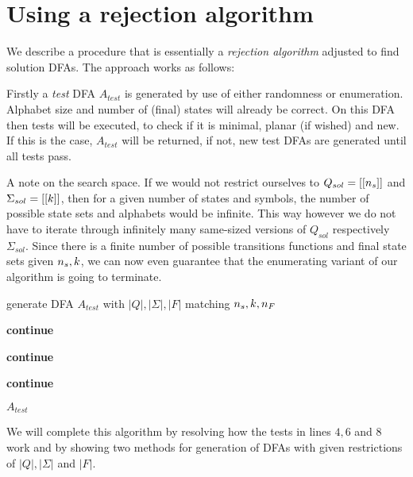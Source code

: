 \section{Using a rejection algorithm}

We describe a procedure that is essentially a \emph{rejection algorithm} adjusted to find solution DFAs. The approach works as follows:

Firstly a \emph{test} DFA $A_{test}$ is generated by use of either randomness or enumeration. Alphabet size and number of (final) states will already be correct. On this DFA then tests will be executed, to check if it is minimal, planar (if wished) and new. If this is the case, $A_{test}$ will be returned, if not, new test DFAs are generated until all tests pass.

A note on the search space. If we would not restrict ourselves to $Q_{sol} = [[{n_s}]]$ and $\Sigma_{sol} = [[k]]$, then for a given number of states and symbols, the number of possible state sets and alphabets would be infinite. This way however we do not have to iterate through infinitely many same-sized versions of $Q_{sol}$ respectively $\Sigma_{sol}$. Since there is a finite number of possible transitions functions and final state sets given ${n_s}, k$, we can now even guarantee that the enumerating variant of our algorithm is going to terminate.

\vspace{0.2cm}
\begin{algorithmic}[1]
		
			\vspace{0.2cm}
		
			\State generate DFA $A_{test}$ with $|Q|, |\Sigma|, |F|$ matching ${n_s}, k, {n_F}$
			
			\vspace{0.2cm}
			
				\State \textbf{continue}
			\EndIf
			
				\State \textbf{continue}
			\EndIf
			
				\State \textbf{continue}
			\EndIf
			
			\vspace{0.2cm}
			
			\State\Return $A_{test}$
		\EndWhile
	\EndFunction
\end{algorithmic}
\vspace{0.2cm}
We will complete this algorithm by resolving how the tests in lines $4, 6$ and $8$ work and by showing two methods for generation of DFAs with given restrictions of $|Q|, |\Sigma|$ and $|F|$.

